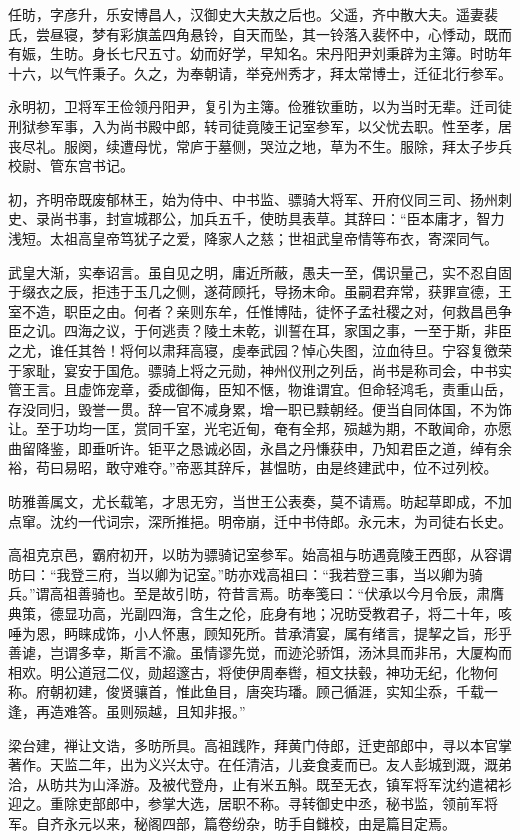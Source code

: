\documentclass[12pt,UTF8]{ctexbook}
\begin{document}
任昉，字彦升，乐安博昌人，汉御史大夫敖之后也。父遥，齐中散大夫。遥妻裴氏，尝昼寝，梦有彩旗盖四角悬铃，自天而坠，其一铃落入裴怀中，心悸动，既而有娠，生昉。身长七尺五寸。幼而好学，早知名。宋丹阳尹刘秉辟为主簿。时昉年十六，以气忤秉子。久之，为奉朝请，举兗州秀才，拜太常博士，迁征北行参军。

永明初，卫将军王俭领丹阳尹，复引为主簿。俭雅钦重昉，以为当时无辈。迁司徒刑狱参军事，入为尚书殿中郎，转司徒竟陵王记室参军，以父忧去职。性至孝，居丧尽礼。服阕，续遭母忧，常庐于墓侧，哭泣之地，草为不生。服除，拜太子步兵校尉、管东宫书记。

初，齐明帝既废郁林王，始为侍中、中书监、骠骑大将军、开府仪同三司、扬州刺史、录尚书事，封宣城郡公，加兵五千，使昉具表草。其辞曰：“臣本庸才，智力浅短。太祖高皇帝笃犹子之爱，降家人之慈；世祖武皇帝情等布衣，寄深同气。

武皇大渐，实奉诏言。虽自见之明，庸近所蔽，愚夫一至，偶识量己，实不忍自固于缀衣之辰，拒违于玉几之侧，遂荷顾托，导扬末命。虽嗣君弃常，获罪宣德，王室不造，职臣之由。何者？亲则东牟，任惟博陆，徒怀子孟社稷之对，何救昌邑争臣之讥。四海之议，于何逃责？陵土未乾，训誓在耳，家国之事，一至于斯，非臣之尤，谁任其咎！将何以肃拜高寝，虔奉武园？悼心失图，泣血待旦。宁容复徼荣于家耻，宴安于国危。骠骑上将之元勋，神州仪刑之列岳，尚书是称司会，中书实管王言。且虚饰宠章，委成御侮，臣知不惬，物谁谓宜。但命轻鸿毛，责重山岳，存没同归，毁誉一贯。辞一官不减身累，增一职已黩朝经。便当自同体国，不为饰让。至于功均一匡，赏同千室，光宅近甸，奄有全邦，殒越为期，不敢闻命，亦愿曲留降鉴，即垂听许。钜平之恳诚必固，永昌之丹慊获申，乃知君臣之道，绰有余裕，苟曰易昭，敢守难夺。”帝恶其辞斥，甚愠昉，由是终建武中，位不过列校。

昉雅善属文，尤长载笔，才思无穷，当世王公表奏，莫不请焉。昉起草即成，不加点窜。沈约一代词宗，深所推挹。明帝崩，迁中书侍郎。永元末，为司徒右长史。

高祖克京邑，霸府初开，以昉为骠骑记室参军。始高祖与昉遇竟陵王西邸，从容谓昉曰：“我登三府，当以卿为记室。”昉亦戏高祖曰：“我若登三事，当以卿为骑兵。”谓高祖善骑也。至是故引昉，符昔言焉。昉奉笺曰：“伏承以今月令辰，肃膺典策，德显功高，光副四海，含生之伦，庇身有地；况昉受教君子，将二十年，咳唾为恩，眄睐成饰，小人怀惠，顾知死所。昔承清宴，属有绪言，提挈之旨，形乎善谑，岂谓多幸，斯言不渝。虽情谬先觉，而迹沦骄饵，汤沐具而非吊，大厦构而相欢。明公道冠二仪，勋超邃古，将使伊周奉辔，桓文扶毂，神功无纪，化物何称。府朝初建，俊贤骧首，惟此鱼目，唐突玙璠。顾己循涯，实知尘忝，千载一逢，再造难答。虽则殒越，且知非报。”

梁台建，禅让文诰，多昉所具。高祖践阼，拜黄门侍郎，迁吏部郎中，寻以本官掌著作。天监二年，出为义兴太守。在任清洁，儿妾食麦而已。友人彭城到溉，溉弟洽，从昉共为山泽游。及被代登舟，止有米五斛。既至无衣，镇军将军沈约遣裙衫迎之。重除吏部郎中，参掌大选，居职不称。寻转御史中丞，秘书监，领前军将军。自齐永元以来，秘阁四部，篇卷纷杂，昉手自雠校，由是篇目定焉。
\end{document}
